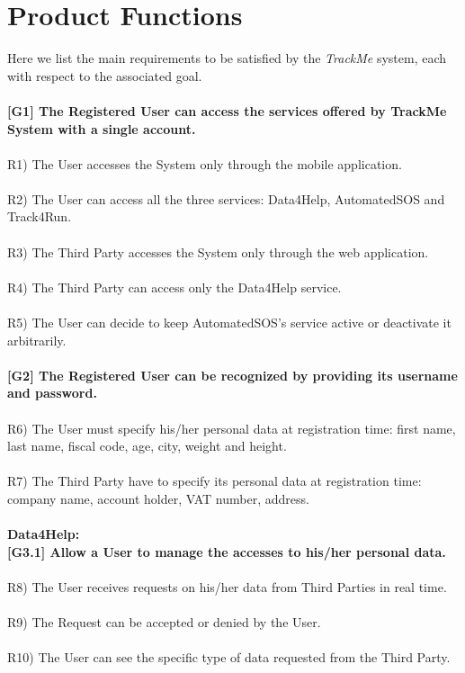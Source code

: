 \section{Product Functions}

Here we list the main requirements to be satisfied by the \textit{TrackMe} system, each with respect to the associated goal. \\ \\

\textbf{[G1] The Registered User can access the services offered by TrackMe System with a single account. } \\ \\
R1) The User accesses the System only through the mobile application. \\ \\
R2) The User can access all the three services: Data4Help, AutomatedSOS and Track4Run. \\ \\
R3) The Third Party accesses the System only through the web application. \\ \\
R4) The Third Party can access only the Data4Help service. \\ \\
R5) The User can decide to keep AutomatedSOS's service active or deactivate it arbitrarily. \\ \\

\textbf{[G2] The Registered User can be recognized by providing its username and password.} \\ \\
R6) The User must specify his/her personal data at registration time: first name, last name, fiscal code, age, city, weight and height. \\ \\
R7) The Third Party have to specify its personal data at registration time: company name, account holder, VAT number, address. \\ \\

\textbf{Data4Help:} \\

\textbf{[G3.1] Allow a User to manage the accesses to his/her personal data.} \\ \\
R8) The User receives requests on his/her data from Third Parties in real time. \\ \\
R9) The Request can be accepted or denied by the User.\\ \\
R10) The User can see the specific type of data requested from the Third Party. \\ \\ 


